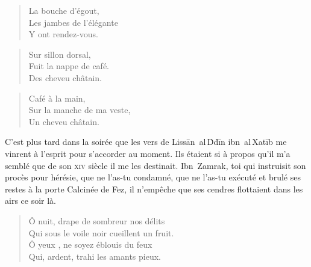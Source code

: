 \begin{verse}\haiku
  La bouche d’égout,\\  %
  Les jambes de l’élégante\\  %
  Y ont rendez-vous.
\end{verse}

\begin{verse}\haiku
  Sur sillon dorsal,\\  %
  Fuit la nappe de café.\\  %
  Des cheveu châtain.
\end{verse}

\begin{verse}\haiku
  Café à la main,\\  %
  Sur la manche de ma veste,\\  %
  Un cheveu châtain.
\end{verse}

\begin{prose}
  C’est plus tard dans la soirée que les vers de Lissān~al\,Ḋḋīn ibn~al\,Xatīb me vinrent à l’esprit pour s’accorder au moment.
  Ils étaient si à propos qu’il m’a semblé que de son \textsc{xiv}\ieme{} siècle il me les destinait.
  Ibn~Zamrak, toi qui instruisit son procès pour hérésie, que ne l’as-tu condamné, que ne l’as-tu exécuté et brulé ses restes  à la porte Calcinée de Fez, il n’empêche que ses cendres flottaient dans les airs ce soir là.
\end{prose}

\begin{verse}\quatrain
  Ô nuit, drape de sombreur nos délits\\ 
  Qui sous le voile noir cueillent un fruit.\\ 
  Ô yeux%
  \label{foot.vocaliseYeuxNuit}, ne soyez  éblouis du feux\\ 
  Qui, ardent, trahi les amants pieux. %
\end{verse}

